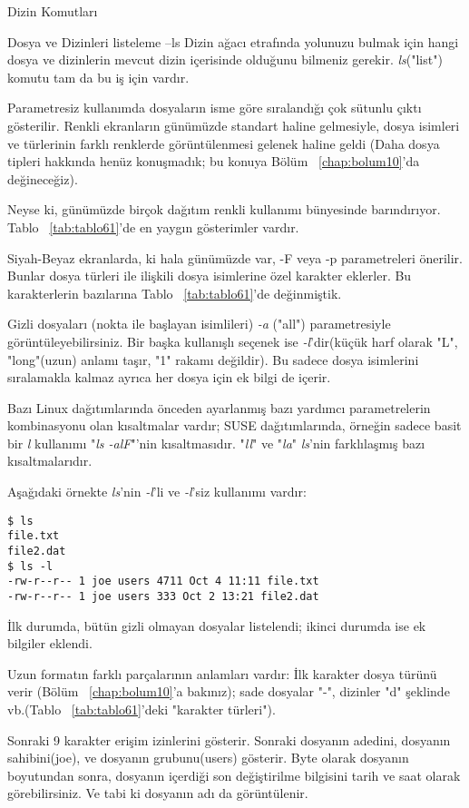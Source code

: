 \begin{section}{Dizin Komutları}
\begin{subsection}{Dosya ve Dizinleri listeleme --ls}
Dizin ağacı etrafında yolunuzu bulmak için hangi dosya ve dizinlerin mevcut dizin içerisinde olduğunu bilmeniz gerekir. \emph{ls}("list") komutu tam da bu iş için vardır.

Parametresiz kullanımda dosyaların isme göre sıralandığı çok sütunlu çıktı gösterilir. Renkli ekranların günümüzde standart haline gelmesiyle, dosya isimleri ve türlerinin farklı renklerde görüntülenmesi gelenek haline geldi (Daha dosya tipleri hakkında henüz konuşmadık; bu konuya Bölüm ~\ref{chap:bolum10}'da değineceğiz).
	
Neyse ki, günümüzde birçok dağıtım renkli kullanımı bünyesinde barındırıyor. Tablo ~\ref{tab:tablo61}'de en yaygın gösterimler vardır.

Siyah-Beyaz ekranlarda, ki hala günümüzde var, -F veya -p parametreleri önerilir. Bunlar dosya türleri ile ilişkili dosya isimlerine özel karakter eklerler. Bu karakterlerin bazılarına Tablo ~\ref{tab:tablo61}'de değinmiştik.
	
Gizli dosyaları (nokta ile başlayan isimlileri) \emph{-a} ("all") parametresiyle görüntüleyebilirsiniz. Bir başka kullanışlı seçenek ise \emph{-l}'dir(küçük harf olarak "L", "long"(uzun) anlamı taşır, "1" rakamı değildir). Bu sadece dosya isimlerini sıralamakla kalmaz ayrıca her dosya için ek bilgi de içerir.
	
Bazı Linux dağıtımlarında önceden ayarlanmış bazı yardımcı parametrelerin kombinasyonu olan kısaltmalar vardır; SUSE dağıtımlarında, örneğin sadece basit bir \emph{l} kullanımı "\emph{ls -alF}"'nin kısaltmasıdır. "\emph{ll}" ve "\emph{la}" \emph{ls}'nin farklılaşmış bazı kısaltmalarıdır.
	
Aşağıdaki örnekte \emph{ls}'nin \emph{-l}'li ve \emph{-l}'siz kullanımı vardır:
\footnotesize 
\begin{verbatim}
$ ls
file.txt
file2.dat
$ ls -l
-rw-r--r-- 1 joe users 4711 Oct 4 11:11 file.txt
-rw-r--r-- 1 joe users 333 Oct 2 13:21 file2.dat
\end{verbatim}
\normalsize 

İlk durumda, bütün gizli olmayan dosyalar listelendi; ikinci durumda ise ek bilgiler eklendi.

Uzun formatın farklı parçalarının anlamları vardır: İlk karakter dosya türünü verir (Bölüm ~\ref{chap:bolum10}'a bakınız); sade dosyalar "-", dizinler "d" şeklinde vb.(Tablo ~\ref{tab:tablo61}'deki "karakter türleri").
	
Sonraki 9 karakter erişim izinlerini gösterir. Sonraki dosyanın adedini, dosyanın sahibini(joe), ve dosyanın grubunu(users) gösterir. Byte olarak dosyanın boyutundan sonra, dosyanın içerdiği son değiştirilme bilgisini tarih ve saat olarak görebilirsiniz. Ve tabi ki dosyanın adı da görüntülenir.
	

\end{subsection}
\end{section}
